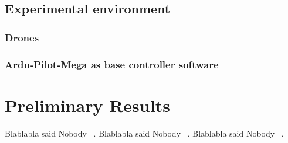 \documentclass[11pt]{article}
\begin{document}

\subsection{Experimental environment}
\subsubsection{Drones}
\subsubsection{Ardu-Pilot-Mega as base controller software}
\label{sec:APM}

\section{Preliminary Results}
Blablabla said Nobody ~\cite{Merav}.
Blablabla said Nobody ~\cite{APM}.
Blablabla said Nobody ~\cite{RTComposer}.



    
    {}
\end{document}
